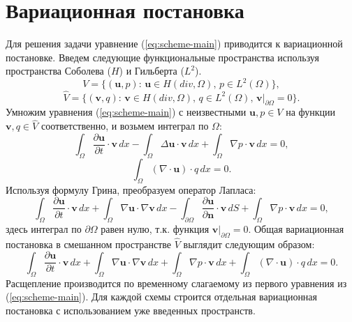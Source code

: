 \documentclass[12pt]{article}
\begin{document}

\section{Вариационная постановка}
Для решения задачи уравнение (\ref{eq:scheme-main}) приводится к вариационной постановке.
Введем следующие функциональные пространства используя пространства Соболева ($H$) и Гильберта ($L^2$).
$$
V=\{ ({\bm u}, p) : \, {\bm u} \in H(div, \Omega), \, p \in L^2(\Omega) \},
$$
$$
\hat V=\{ ({\bm v}, q) : \, {\bm v} \in H(div, \Omega), \, q \in L^2(\Omega), \, {\bm v}|_{\partial \Omega}=0 \}.
$$
Умножим уравнения (\ref{eq:scheme-main}) с неизвестными ${\bm u}, p \in V$  на функции ${\bm v}, q \in \hat V$ соответственно, и возьмем интеграл по $\Omega$:
$$
\int_{\Omega} \frac{\partial {\bm u}}{\partial t} \cdot {\bm v} \,dx - \int_{\Omega} \Delta {\bm u} \cdot {\bm v} \,dx + \int_{\Omega} \nabla p \cdot {\bm v} \,dx = 0,
$$
$$
\int_{\Omega} (\nabla \cdot {\bm u}) \cdot q \,dx = 0.
$$
Используя формулу Грина, преобразуем оператор Лапласа:
$$
\int_{\Omega} \frac{\partial {\bm u}}{\partial t} \cdot {\bm v} \,dx + \int_{\Omega} \nabla {\bm u} \cdot \nabla {\bm v} \,dx - \int_{\partial \Omega} \frac{\partial {\bm u}}{\partial {\bm n}} \cdot {\bm v} \,dS + \int_{\Omega} \nabla p \cdot {\bm v} \,dx = 0,
$$
здесь интеграл по $\partial \Omega$ равен нулю, т.к. функция ${\bm v} | _ {\partial \Omega} = 0$. Общая вариационная постановка в смешанном пространстве $\hat V$ выглядит следующим образом:
$$
\int_{\Omega} \frac{\partial {\bm u}}{\partial t} \cdot {\bm v} \,dx + \int_{\Omega} \nabla {\bm u} \cdot \nabla {\bm v} \,dx + \int_{\Omega} \nabla p \cdot {\bm v} \,dx + \int_{\Omega} (\nabla \cdot {\bm u}) \cdot q \,dx = 0.
$$
Расщепление производится по временному слагаемому из первого уравнения из (\ref{eq:scheme-main}). Для каждой схемы строится отдельная вариационная постановка с использованием уже введенных пространств.
\end{document}
